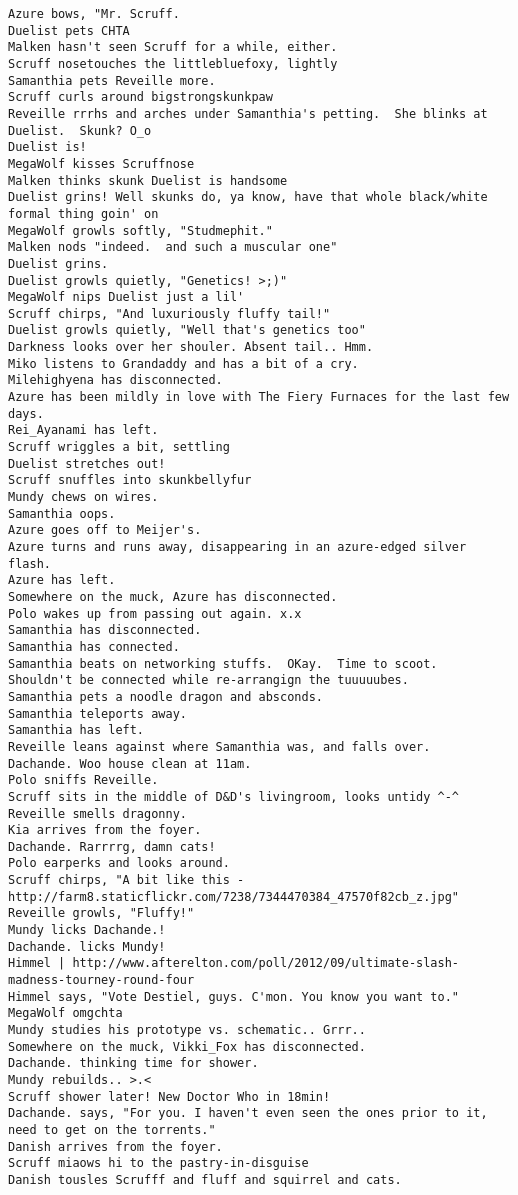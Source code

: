 \begin{verbatim}
Azure bows, "Mr. Scruff.
Duelist pets CHTA
Malken hasn't seen Scruff for a while, either.
Scruff nosetouches the littlebluefoxy, lightly
Samanthia pets Reveille more.
Scruff curls around bigstrongskunkpaw
Reveille rrrhs and arches under Samanthia's petting.  She blinks at Duelist.  Skunk? O_o
Duelist is!
MegaWolf kisses Scruffnose
Malken thinks skunk Duelist is handsome
Duelist grins! Well skunks do, ya know, have that whole black/white formal thing goin' on
MegaWolf growls softly, "Studmephit."
Malken nods "indeed.  and such a muscular one"
Duelist grins.
Duelist growls quietly, "Genetics! >;)"
MegaWolf nips Duelist just a lil'
Scruff chirps, "And luxuriously fluffy tail!"
Duelist growls quietly, "Well that's genetics too"
Darkness looks over her shouler. Absent tail.. Hmm.
Miko listens to Grandaddy and has a bit of a cry.
Milehighyena has disconnected.
Azure has been mildly in love with The Fiery Furnaces for the last few days.
Rei_Ayanami has left.
Scruff wriggles a bit, settling
Duelist stretches out!
Scruff snuffles into skunkbellyfur
Mundy chews on wires.
Samanthia oops.
Azure goes off to Meijer's.
Azure turns and runs away, disappearing in an azure-edged silver flash.
Azure has left.
Somewhere on the muck, Azure has disconnected.
Polo wakes up from passing out again. x.x
Samanthia has disconnected.
Samanthia has connected.
Samanthia beats on networking stuffs.  OKay.  Time to scoot.  Shouldn't be connected while re-arrangign the tuuuuubes.
Samanthia pets a noodle dragon and absconds.
Samanthia teleports away.
Samanthia has left.
Reveille leans against where Samanthia was, and falls over.
Dachande. Woo house clean at 11am.
Polo sniffs Reveille.
Scruff sits in the middle of D&D's livingroom, looks untidy ^-^
Reveille smells dragonny.
Kia arrives from the foyer.
Dachande. Rarrrrg, damn cats!
Polo earperks and looks around.
Scruff chirps, "A bit like this - http://farm8.staticflickr.com/7238/7344470384_47570f82cb_z.jpg"
Reveille growls, "Fluffy!"
Mundy licks Dachande.!
Dachande. licks Mundy!
Himmel | http://www.afterelton.com/poll/2012/09/ultimate-slash-madness-tourney-round-four
Himmel says, "Vote Destiel, guys. C'mon. You know you want to."
MegaWolf omgchta
Mundy studies his prototype vs. schematic.. Grrr..
Somewhere on the muck, Vikki_Fox has disconnected.
Dachande. thinking time for shower.
Mundy rebuilds.. >.<
Scruff shower later! New Doctor Who in 18min!
Dachande. says, "For you. I haven't even seen the ones prior to it, need to get on the torrents."
Danish arrives from the foyer.
Scruff miaows hi to the pastry-in-disguise
Danish tousles Scrufff and fluff and squirrel and cats.

\end{verbatim}
